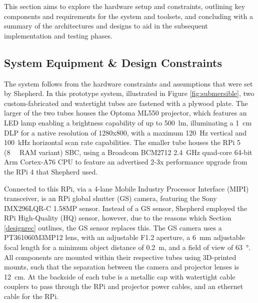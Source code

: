 This section aims to explore the hardware setup and constraints, outlining key components and requirements for the system and toolsets, and concluding with a summary of the architectures and designs to aid in the subsequent implementation and testing phases.

\subsection{System Equipment \& Design Constraints}
\label{designconstraints}

The system follows from the hardware constraints and assumptions that were set by Shepherd. In this prototype system, illustrated in Figure \ref{fig:submersible}, two custom-fabricated and watertight tubes are fastened with a plywood plate. The larger of the two tubes houses the Optoma ML550 projector, which features an LED lamp enabling a brightness capability of up to \SI{500}{\lumen}, illuminating a \SI{1}{\centi\metre} DLP for a native resolution of 1280x800, with a maximum \SI{120}{\hertz} vertical and \SI{100}{\kilo\hertz} horizontal scan rate capabilities. The smaller tube houses the RPi 5 (\SI{8}{\giga\byte} RAM variant) SBC, using a Broadcom BCM2712 \SI{2.4}{\giga\hertz} quad-core 64-bit Arm Cortex-A76 CPU to feature an advertised 2-3x performance upgrade from the RPi 4 that Shepherd used.

Connected to this RPi, via a 4-lane Mobile Industry Processor Interface (MIPI) transceiver, is an RPi global shutter (GS) camera, featuring the Sony IMX296LQR-C 1.58MP sensor. Instead of a GS sensor, Shepherd employed the RPi High-Quality (HQ) sensor, however, due to the reasons which Section \ref{designrec} outlines, the GS sensor replaces this. The GS camera uses a PT361060M3MP12 lens, with an adjustable F1.2 aperture, a \SI{6}{\milli\metre} adjustable focal length for a minimum object distance of \SI{0.2}{\metre}, and a field of view of \SI{63}{\degree}. All components are mounted within their respective tubes using 3D-printed mounts, such that the separation between the camera and projector lenses is \SI{12}{\centi\metre}. At the backside of each tube is a metallic cap with watertight cable couplers to pass through the RPi and projector power cables, and an ethernet cable for the RPi.

